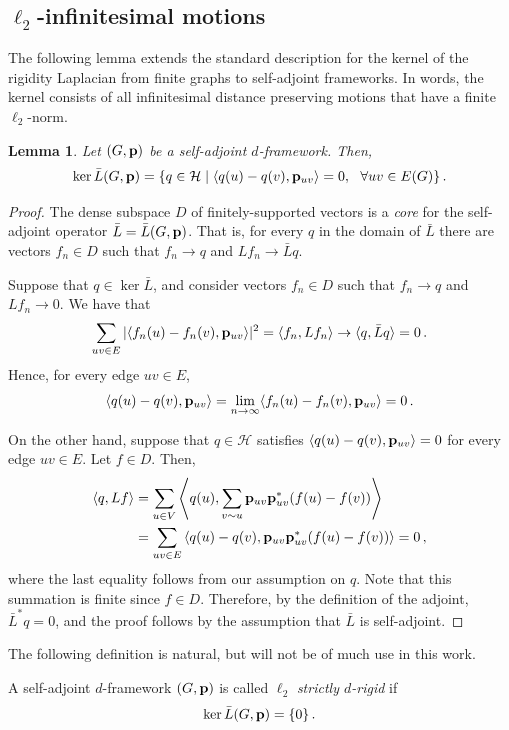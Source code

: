 \documentclass[reqno,english]{amsart}
\numberwithin{equation}{section}
\newtheorem{lemma}[theorem]{Lemma}
\theoremstyle{definition}{
\newtheorem{example}[theorem]{Example}
\newtheorem{definition}[theorem]{Definition}
\newtheorem*{definition*}{Definition}
\newtheorem{problem}[theorem]{Problem}
\newtheorem{question}[theorem]{Question}
}
\newcommand{\cH}{\mathcal H}
\newcommand{\p}{{\bf p}}
\begin{document}
\subsection{$\ell_2$-infinitesimal motions}
The following lemma extends the standard description for the kernel of the rigidity Laplacian from finite graphs to self-adjoint frameworks. In words, the kernel consists of all infinitesimal distance preserving motions that have a finite $\ell_2$-norm.
\begin{lemma}\label{lem:kernel}
Let $(G,\p)$ be a self-adjoint $d$-framework. Then,
\[
\ker \bar L(G,\p) = \{q\in\cH\mid \langle q(u)-q(v),\p_{uv}\rangle=0,~~\forall uv \in E(G)\}\,.
\]
\end{lemma}
\begin{proof}
The dense subspace $D$ of finitely-supported vectors is a {\em core} for the self-adjoint operator $\bar L=\bar L(G,\p)$. That is, for every $q$ in the domain of $\bar L$ there are vectors $f_n \in D$ such that $f_n\to q$ and $Lf_n\to \bar L q$. 

Suppose that $q\in \ker \bar L$, and consider vectors $f_n \in D$ such that $f_n\to q$ and $Lf_n\to 0$. We have that
\[
\sum_{uv\in E}|\langle f_n(u)-f_n(v),\p_{uv}\rangle|^2 = \langle f_n,Lf_n\rangle \to \langle q,\bar Lq\rangle =0\,.
\]
Hence, for every edge $uv \in E$, 
\[
\langle q(u)-q(v),\p_{uv}\rangle=\lim_{n\to \infty}\langle f_n(u)-f_n(v),\p_{uv}\rangle = 0\,.
\]

On the other hand, suppose that $q\in\cH$ satisfies $\langle q(u)-q(v),\p_{uv}\rangle=0$ for every edge $uv\in E$. Let $f\in D$. Then,
\begin{align*}
\langle q,Lf\rangle &= \sum_{u \in V}\left\langle q(u),\sum_{v\sim u}\p_{uv}\p_{uv}^*(f(u)-f(v)) \right\rangle \\
&= \sum_{uv\in E}\left\langle q(u)-q(v),\p_{uv}\p_{uv}^*(f(u)-f(v)) \right\rangle=0\,,
\end{align*}
where the last equality follows from our assumption on $q$. Note that this summation is finite since $f\in D$. Therefore, by the definition of the adjoint, $\bar L^*q=0$, and the proof follows by the assumption that $\bar L$ is self-adjoint.
\end{proof}

The following definition is natural, but will not be of much use in this work.
\begin{definition}
    A self-adjoint $d$-framework $(G,\p)$ is called $\ell_2$ \emph{strictly $d$-rigid} if \[\ker \bar L(G,\p)=\{0\}\,.\]
\end{definition}
\end{document}
